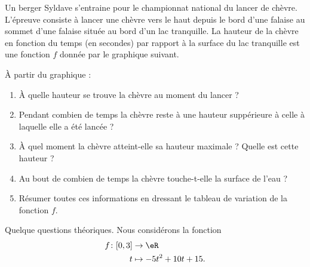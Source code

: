 
\begin{exercice}\label{exosmath-0238}

    Un berger Syldave s'entraine pour le championnat national du lancer de chèvre. L'épreuve consiste à lancer une chèvre vers le haut depuis le bord d'une falaise au sommet d'une falaise située au bord d'un lac tranquille. La hauteur de la chèvre en fonction du temps (en secondes) par rapport à la surface du lac tranquille est une fonction \( f\) donnée par le graphique suivant.

    \begin{center}

    \end{center}
    À partir du graphique :
    \begin{enumerate}
        \item
            À quelle hauteur se trouve la chèvre au moment du lancer ?
        \item
            Pendant combien de temps la chèvre reste à une hauteur suppérieure à celle à laquelle elle a été lancée ?
        \item
            À quel moment la chèvre atteint-elle sa hauteur maximale ? Quelle est cette hauteur ?
        \item
            Au bout de combien de temps la chèvre touche-t-elle la surface de l'eau ?
        \item
            Résumer toutes ces informations en dressant le tableau de variation de la fonction \( f\).
    \end{enumerate}
    Quelque questions théoriques. Nous considérons la fonction
            \begin{equation}
                \begin{aligned}
                    f\colon \mathopen[ 0 , 3 \mathclose]&\to \eR \\
                    t&\mapsto -5t^2+10t+15. 
                \end{aligned}
            \end{equation}
            

\end{exercice}
